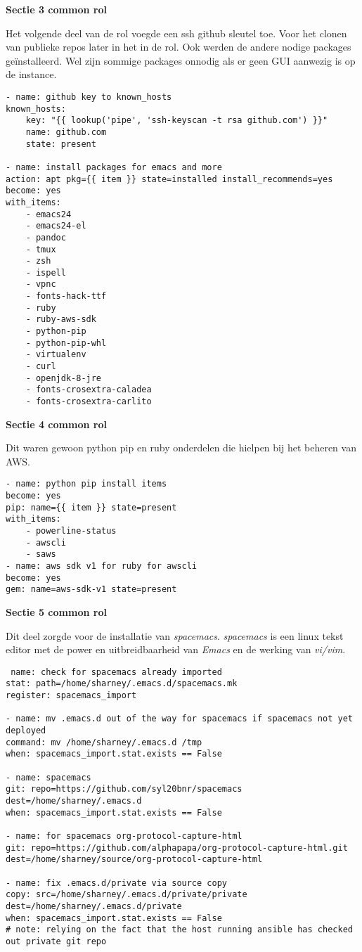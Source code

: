 \newpage
\textbf{Sectie 3 common rol}

Het volgende deel van de rol voegde een ssh github sleutel toe. Voor het clonen van publieke repos later in het in de rol. Ook werden de andere nodige packages geïnstalleerd. Wel zijn sommige packages onnodig als er geen GUI aanwezig is op de instance.
\begin{lstlisting}
- name: github key to known_hosts
known_hosts:
    key: "{{ lookup('pipe', 'ssh-keyscan -t rsa github.com') }}"
    name: github.com
    state: present

- name: install packages for emacs and more
action: apt pkg={{ item }} state=installed install_recommends=yes
become: yes
with_items:
    - emacs24
    - emacs24-el
    - pandoc
    - tmux
    - zsh
    - ispell
    - vpnc
    - fonts-hack-ttf
    - ruby
    - ruby-aws-sdk
    - python-pip
    - python-pip-whl
    - virtualenv
    - curl
    - openjdk-8-jre
    - fonts-crosextra-caladea
    - fonts-crosextra-carlito 
\end{lstlisting}

\textbf{Sectie 4 common rol}

Dit waren gewoon python pip en ruby onderdelen die hielpen bij het beheren van AWS.
\begin{lstlisting}
- name: python pip install items
become: yes
pip: name={{ item }} state=present
with_items:
    - powerline-status
    - awscli
    - saws
- name: aws sdk v1 for ruby for awscli
become: yes
gem: name=aws-sdk-v1 state=present
\end{lstlisting}

\textbf{Sectie 5 common rol}

Dit deel zorgde voor de installatie van \textit{spacemacs}. \textit{spacemacs} is een linux tekst editor met de power en uitbreidbaarheid van \textit{Emacs} en de werking van \textit{vi/vim}.
\begin{lstlisting}
 name: check for spacemacs already imported
stat: path=/home/sharney/.emacs.d/spacemacs.mk
register: spacemacs_import

- name: mv .emacs.d out of the way for spacemacs if spacemacs not yet deployed
command: mv /home/sharney/.emacs.d /tmp
when: spacemacs_import.stat.exists == False

- name: spacemacs
git: repo=https://github.com/syl20bnr/spacemacs dest=/home/sharney/.emacs.d 
when: spacemacs_import.stat.exists == False

- name: for spacemacs org-protocol-capture-html
git: repo=https://github.com/alphapapa/org-protocol-capture-html.git dest=/home/sharney/source/org-protocol-capture-html

- name: fix .emacs.d/private via source copy
copy: src=/home/sharney/.emacs.d/private/private dest=/home/sharney/.emacs.d/private
when: spacemacs_import.stat.exists == False
# note: relying on the fact that the host running ansible has checked out private git repo
\end{lstlisting}

